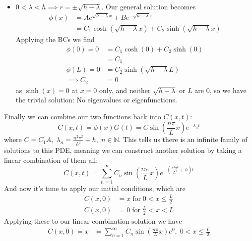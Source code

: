 \documentclass[12pt]{article}
\numberwithin{equation}{section}
\numberwithin{figure}{section}
\begin{document}
\begin{enumerate}
\begin{enumerate}
\begin{itemize}
                \item $0<\lambda<h \implies r=\pm\sqrt{h-\lambda}$. Our general solution becomes 
                \begin{align*}
                    \phi(x)&=Ae^{\sqrt{h-\lambda}x}+Be^{-\sqrt{h-\lambda}x}\\
                    &=C_1\cosh(\sqrt{h-\lambda}x)+C_2\sinh(\sqrt{h-\lambda}x)
                \end{align*}
                Applying the BCs we find 
                \begin{align*}
                    \phi(0)=0&=C_1\cosh(0)+C_2\sinh(0)\\
                    &=C_1\\
                    \phi(L)=0&=C_2\sinh(\sqrt{h-\lambda}L)\\
                    \implies C_2&=0
                \end{align*}
                as $\sinh(x)=0$ at $x=0$ only, and neither $\sqrt{h-\lambda}$ or $L$ are 0, so we have the trivial 
                solution: No eigenvalues or eigenfunctions.
            \end{itemize}
            Finally we can combine our two functions back into $C(x,t)$:
            \begin{equation*}
                C(x,t)=\phi(x)G(t)=C\sin(\frac{n\pi}{L}x)e^{-\lambda_n t}
            \end{equation*}
            where $C=C_1A,\; \lambda_n=\frac{n^2\pi^2}{L^2}+h,\; n\in\mathbb{N}$. This tells us there is an infinite 
            family of solutions to this PDE, meaning we can construct another solution by taking a linear combination 
            of them all:
            \begin{equation*}
                C(x,t)=\sum_{n=1}^{\infty}C_n \sin(\frac{n\pi}{L}x) e^{-\left(\frac{n^2\pi^2}{L^2}+h\right)t}
            \end{equation*}
            And now it's time to apply our initial conditions, which are 
            \begin{align*}
                C(x,0)&=x \;\text{for}\; 0<x\leq \frac{L}{2}\\
                C(x,0)&=0 \;\text{for}\; \frac{L}{2}<x<L
            \end{align*}
            Applying these to our linear combination solution we have 
            \begin{align*}
                C(x,0)=x&=\sum_{n=1}^{\infty} C_n\sin(\frac{n\pi}{L}x) e^0,\; 0<x\leq \frac{L}{2}\\

\end{align*}
\end{enumerate}
\end{enumerate}
\end{document}

